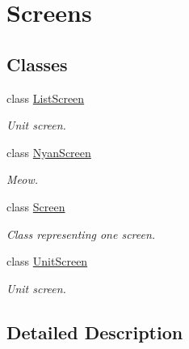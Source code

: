 \hypertarget{group__screens}{}\section{Screens}
\label{group__screens}
\subsection*{Classes}
\begin{DoxyCompactItemize}
\item 
class \mbox{\hyperlink{classListScreen}{List\+Screen}}
\begin{DoxyCompactList}\small\item\em Unit screen. \end{DoxyCompactList}\item 
class \mbox{\hyperlink{classNyanScreen}{Nyan\+Screen}}
\begin{DoxyCompactList}\small\item\em Meow. \end{DoxyCompactList}\item 
class \mbox{\hyperlink{classScreen}{Screen}}
\begin{DoxyCompactList}\small\item\em Class representing one screen. \end{DoxyCompactList}\item 
class \mbox{\hyperlink{classUnitScreen}{Unit\+Screen}}
\begin{DoxyCompactList}\small\item\em Unit screen. \end{DoxyCompactList}\end{DoxyCompactItemize}


\subsection{Detailed Description}
